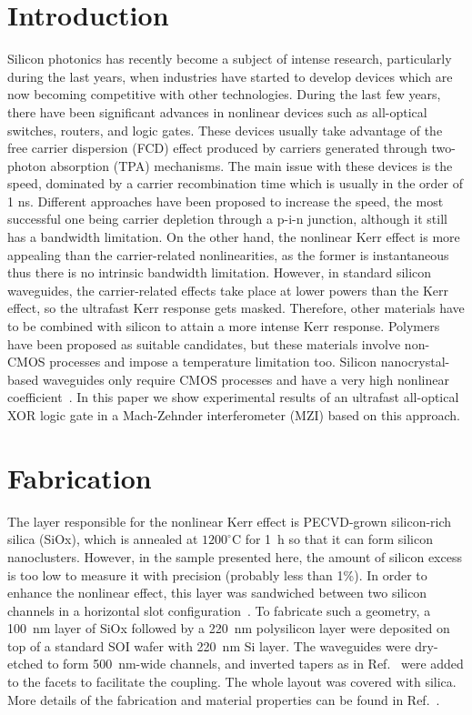 \section{Introduction}
Silicon photonics has recently become a subject of intense research, particularly during the last years, when industries have started to develop devices which are now becoming competitive with other technologies. During the last few years, there have been significant advances in nonlinear devices such as all-optical switches, routers, and logic gates. These devices usually take advantage of the free carrier dispersion (FCD) effect produced by carriers generated through two-photon absorption (TPA) mechanisms. The main issue with these devices is the speed, dominated by a carrier recombination time which is usually in the order of 1 ns. Different approaches have been proposed to increase the speed, the most successful one being carrier depletion through a p-i-n junction,\cite{Turner-Foster2010} although it still has a bandwidth limitation.
On the other hand, the nonlinear Kerr effect is more appealing than the carrier-related nonlinearities, as the former is instantaneous thus there is no intrinsic bandwidth limitation. However, in standard silicon waveguides, the carrier-related effects take place at lower powers than the Kerr effect, so the ultrafast Kerr response gets masked. Therefore, other materials have to be combined with silicon to attain a more intense Kerr response. Polymers have been proposed as suitable candidates,\cite{Koos2009} but these materials involve non-CMOS processes and impose a temperature limitation too. Silicon nanocrystal-based waveguides only require CMOS processes and have a very high nonlinear coefficient~\cite{Spano2009}. In this paper we show experimental results of an ultrafast all-optical XOR logic gate in a Mach-Zehnder interferometer (MZI) based on this approach.


\section{Fabrication}
The layer responsible for the nonlinear Kerr effect is PECVD-grown silicon-rich silica (SiOx), which is annealed at $1200^\circ$C for 1~h so that it can form silicon nanoclusters. However, in the sample presented here, the amount of silicon excess is too low to measure it with precision (probably less than 1\%). In order to enhance the nonlinear effect, this layer was sandwiched between two silicon channels in a horizontal slot configuration~\cite{Jordana2007}. To fabricate such a geometry, a 100~nm layer of SiOx followed by a 220~nm polysilicon layer were deposited on top of a standard SOI wafer with 220~nm Si layer. The waveguides were dry-etched to form 500~nm-wide channels, and inverted tapers as in Ref.~\cite{Bakir2010} were added to the facets to facilitate the coupling. The whole layout was covered with silica. More details of the fabrication and material properties can be found in Ref.~\cite{Martinez2010}.


